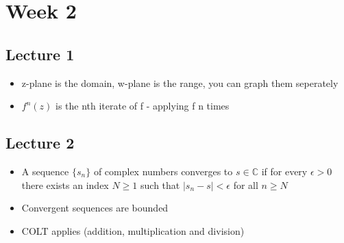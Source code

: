 \documentclass[a4paper]{article}
\begin{document}
\section{Week 2}
\subsection{Lecture 1}
\begin{itemize}
\item z-plane is the domain, w-plane is the range, you can graph them seperately
\item $f^n(z)$ is the nth iterate of f - applying f n times
\end{itemize}

\subsection{Lecture 2}
\begin{itemize}
\item A sequence $\{s_n\}$ of complex numbers converges to $s \in \mathbb{C}$ if for every $\epsilon > 0$ there exists an index $N \geq 1$ such that $|s_n - s| < \epsilon$ for all $n \geq N$
\item Convergent sequences are bounded
\item COLT applies (addition, multiplication and division)

\end{itemize}
\end{document}
